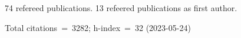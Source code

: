 74 refereed publications. 13 refeered publications as first author.

Total citations~=~3282; h-index~=~32 (2023-05-24)